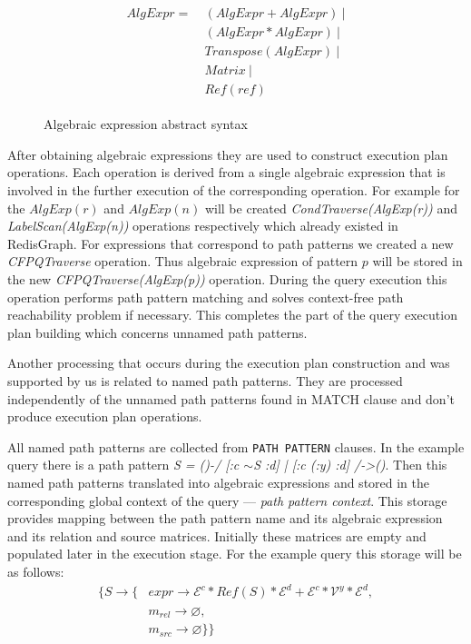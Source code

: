 
\begin{figure}[H]
\caption{Algebraic expression abstract syntax}
\label{fig:alg-expr}
\begin{align*}
\begin{split}
AlgExpr= ~ &(AlgExpr + AlgExpr)~| \\
           &(AlgExpr * AlgExpr)~| \\
           &Transpose(AlgExpr)~| \\
           &Matrix~| \\
           &Ref(ref)        
\end{split}
\end{align*}
\end{figure}

After obtaining algebraic expressions they are used to construct execution plan operations. Each operation is derived from a single algebraic expression that is involved in the further execution of the corresponding operation. For example for the $AlgExp(r)$ and $AlgExp(n)$ will be created \textit{CondTraverse(AlgExp(r))} and \textit{LabelScan(AlgExp(n))} operations respectively which already existed in RedisGraph. For expressions that correspond to path patterns we created a new \textit{CFPQTraverse} operation. Thus algebraic expression of pattern $p$ will be stored in the new \textit{CFPQTraverse(AlgExp(p))} operation. During the query execution this operation performs path pattern matching and solves context-free path reachability problem if necessary. This completes the part of the query execution plan building which concerns unnamed path patterns.

Another processing that occurs during the execution plan construction and was supported by us is related to named path patterns. They are processed independently of the unnamed path patterns found in MATCH clause and don't produce execution plan operations. 

All named path patterns are collected from \lstinline{PATH PATTERN} clauses. In the example query there is a path pattern \textit{S = ()-/ [:c $\sim$S :d] | [:c (:y) :d] /->()}. Then this named path patterns translated into algebraic expressions and stored in the corresponding global context of the query --- \textit{path pattern context}. This storage provides mapping between the path pattern name and its algebraic expression and its relation and source matrices. Initially these matrices are empty and populated later in the execution stage. For the example query this storage will be as follows:
\begin{align*}
   \{ S  \xrightarrow{} \{ & expr \xrightarrow{} \mathcal{E}^c * Ref(S) * \mathcal{E}^d + \mathcal{E}^c * \mathcal{V}^y * \mathcal{E}^d, \\
                           & m_{rel} \xrightarrow{} \varnothing, \\
                           & m_{src} \xrightarrow{} \varnothing \} \}
\end{align*}

